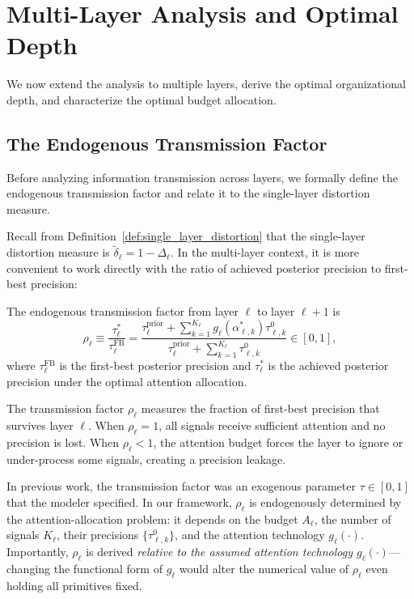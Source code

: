 \section{Multi-Layer Analysis and Optimal Depth}
\label{sec:multi}

We now extend the analysis to multiple layers, derive the optimal organizational depth, and characterize the optimal budget allocation.

\subsection{The Endogenous Transmission Factor}
\label{subsec:transmission_factor}

Before analyzing information transmission across layers, we formally define the endogenous transmission factor and relate it to the single-layer distortion measure.

Recall from Definition~\ref{def:single_layer_distortion} that the single-layer distortion measure is $\tilde{\delta}_\ell = 1 - \Delta_\ell$. In the multi-layer context, it is more convenient to work directly with the ratio of achieved posterior precision to first-best precision:

\begin{definition}\label{def:transmission_factor}
The endogenous transmission factor from layer $\ell$ to layer $\ell+1$ is
\begin{equation}\label{eq:transmission_factor}
\rho_\ell \equiv \frac{\tau^*_\ell}{\tau^{\text{FB}}_\ell} = \frac{\tau^{\text{prior}}_\ell + \sum_{k=1}^{K_\ell} g_\ell(\alpha^*_{\ell,k}) \tau^0_{\ell,k}}{\tau^{\text{prior}}_\ell + \sum_{k=1}^{K_\ell} \tau^0_{\ell,k}} \in [0,1],
\end{equation}
where $\tau^{\text{FB}}_\ell$ is the first-best posterior precision and $\tau^*_\ell$ is the achieved posterior precision under the optimal attention allocation.
\end{definition}

The transmission factor $\rho_\ell$ measures the fraction of first-best precision that survives layer $\ell$. When $\rho_\ell = 1$, all signals receive sufficient attention and no precision is lost. When $\rho_\ell < 1$, the attention budget forces the layer to ignore or under-process some signals, creating a precision leakage.

\begin{remark}\label{rem:exog_to_endog}
In previous work, the transmission factor was an exogenous parameter $\tau \in [0,1]$ that the modeler specified. In our framework, $\rho_\ell$ is endogenously determined by the attention-allocation problem: it depends on the budget $A_\ell$, the number of signals $K_\ell$, their precisions $\{\tau^0_{\ell,k}\}$, and the attention technology $g_\ell(\cdot)$. Importantly, $\rho_\ell$ is derived \emph{relative to the assumed attention technology $g_\ell(\cdot)$}---changing the functional form of $g_\ell$ would alter the numerical value of $\rho_\ell$ even holding all primitives fixed.
\end{remark}

